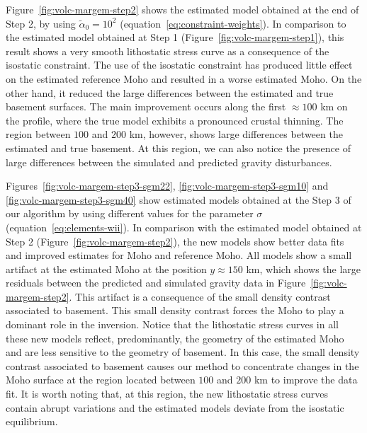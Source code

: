 \documentclass[manuscript]{geophysics}
\begin{document}
Figure~\ref{fig:volc-margem-step2} shows the estimated model obtained at the end
of Step 2, by using $\tilde{\alpha}_{0} = 10^{2}$ (equation~\ref{eq:constraint-weights}).
In comparison to the estimated model obtained at Step 1 (Figure~\ref{fig:volc-margem-step1}),
this result shows a very smooth lithostatic stress curve as a consequence of the
isostatic constraint. The use of the isostatic constraint has produced little effect on the
estimated reference Moho and resulted in a worse estimated Moho.
On the other hand, it reduced the large differences between the estimated and 
true basement surfaces. The main improvement occurs along the 
first $\approx 100$ km on the profile, where the true model exhibits a pronounced crustal
thinning. The region between $100$ and $200$ km, however, shows large 
differences between the estimated and true basement. At this region, we can also
notice the presence of large differences between the simulated and predicted gravity
disturbances.

Figures~\ref{fig:volc-margem-step3-sgm22}, \ref{fig:volc-margem-step3-sgm10} and 
\ref{fig:volc-margem-step3-sgm40} show estimated models obtained at
the Step 3 of our algorithm by using different values for the parameter $\sigma$
(equation~\ref{eq:elements-wii}).
In comparison with the estimated model obtained at Step 2 
(Figure~\ref{fig:volc-margem-step2}), the new models 
show better data fits and improved estimates for Moho and reference Moho.
All models show a small artifact at the estimated Moho at the position
$y \approx 150$ km, which shows the large residuals between the predicted
and simulated gravity data in Figure~\ref{fig:volc-margem-step2}. 
This artifact is a consequence of the small density contrast associated 
to basement. This small density contrast forces the Moho to play a dominant role in the inversion.
Notice that the lithostatic stress curves in all these new models reflect, predominantly, 
the geometry of the estimated Moho and are less sensitive to the geometry of basement.
In this case, the small density contrast associated to basement causes our method to concentrate
changes in the Moho surface at the region located between $100$ and $200$ km to improve the data fit.
It is worth noting that, at this region, the new lithostatic stress curves contain abrupt variations
and the estimated models deviate from the isostatic equilibrium.
\end{document}
